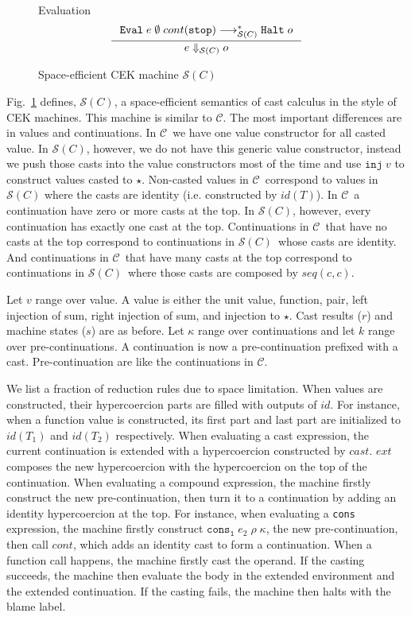 \documentclass[acmsmall,review,anonymous]{acmart}\settopmatter{printfolios=true,printccs=false,printacmref=false}
\newcommand{\figref}[1]{Fig.~\ref{#1}}
\newcommand{\sOOinspect}[3]{\mathtt{Eval} \; #1 \; #2 \; #3}
\newcommand{\sOOhalt}[1]{\mathtt{Halt} \; #1}
\newcommand{\TOOdyn}[0]{\star}
\newcommand{\hcvOOinj}[2]{\mathtt{inj} \; #2}
\newcommand{\hckOOmt}[0]{\mathtt{stop}}
\newcommand{\hckOOconsI}[3]{\mathtt{cons_1}\;#1\;#2\;#3}
\newcommand{\judgeSreduceTrans}[3]{#2 \longrightarrow_{\mathcal{S}(#1)}^{*} #3}
\newcommand{\judgeSeval}[3]{#2 \Downarrow_{\mathcal{S}(#1)} #3}
\newcommand{\ineffCEK}{$ \mathcal{C} $}
\newcommand{\effCEK}[1]{$ \mathcal{S}(#1) $}
\begin{document}
\begin{figure}
	
	Evaluation \fbox{$ \judgeSeval{C}{e}{o} $}
	\[
	\inference{
		\judgeSreduceTrans{C}{
			\sOOinspect{e}{\emptyset}{cont(\hckOOmt)}
		}{
			\sOOhalt{o}
		}		
	}{
		\judgeSeval{C}{e}{o}
	}
	\]
	
	\caption{Space-efficient CEK machine $ \mathcal{S}(C) $}
	\label{machine-cekcc}
\end{figure}
\figref{machine-cekcc} defines, \effCEK{C}, a space-efficient semantics of cast 
calculus in the style of CEK machines.
This machine is similar to \ineffCEK{}. 
The most important differences are in values and continuations.
In \ineffCEK\, we have one value constructor for all casted value.
In \effCEK{C}, however, we do not have this generic value constructor, 
instead we push those casts into the value constructors most of the time and 
use $ \hcvOOinj{P}{v} $ to construct values casted to $ \TOOdyn $.
Non-casted values in \ineffCEK\ correspond to values in \effCEK{C} where the 
casts are identity (i.e. constructed by $ id(T) $).
In \ineffCEK\, a continuation have zero or more casts at the top.
In \effCEK{C}, however, every continuation has exactly one cast at the top.
Continuations in \ineffCEK\ that have no casts at the top correspond to 
continuations in \effCEK{C}\ whose casts are identity.
And continuations in \ineffCEK\ that have many casts at the top correspond to 
continuations in \effCEK{C}\ where those casts are composed by $ 
seq(c,c) $.


Let $ v $ range over value. A value is either the unit value, function, pair, 
left injection of sum, right injection of sum, and injection to $ \TOOdyn $.
Cast results ($ r $) and machine states ($ s $) are as before. 
Let $ \kappa $ range over continuations and let $ k $ range over 
pre-continuations. 
A continuation is now a pre-continuation prefixed with a cast.
Pre-continuation are like the continuations in \ineffCEK.

We list a fraction of reduction rules due to space limitation.
When values are constructed, their hypercoercion parts are filled with outputs 
of $ id $. For instance, when a function value is constructed, its first part 
and last part are initialized to $ id(T_1) $ and $ id(T_2) $ respectively.
When evaluating a cast expression, the current continuation is extended with a 
hypercoercion constructed by $ cast $. $ ext $ composes the new hypercoercion 
with the hypercoercion on the top of the continuation.
When evaluating a compound expression, the machine firstly construct the new 
pre-continuation, then turn it to a continuation by adding an identity 
hypercoercion at the top. For instance, when evaluating a \texttt{cons} 
expression, the machine firstly construct $ \hckOOconsI{e_2}{\rho}{\kappa} $, 
the new pre-continuation, then call $ cont $, which adds an identity cast to 
form a continuation. 
When a function call happens, the machine firstly cast the operand. If the 
casting succeeds, the machine then evaluate the body in the extended 
environment and the extended continuation. If the casting fails, the machine 
then halts with the blame label.
\end{document}

